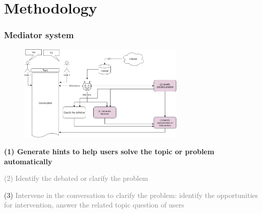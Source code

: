 \documentclass{beamer}
\begin{document}
\section{Methodology} %
\begin{frame}
\frametitle{Mediator system}
\begin{figure}
	\includegraphics[width=80mm]{2.png}
\end{figure}

\end{frame}
\begin{frame}
\par 	\textbf{(1)  Generate hints to help users solve the topic or problem automatically}
\par \textcolor{gray}{(2) Identify the debated or clarify the problem }
\par (3) \textcolor{gray}{ Intervene in the conversation to clarify the problem: identify the opportunities for intervention, answer the related topic question of users }
\end{frame}
\end{document}
